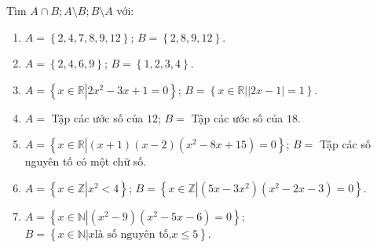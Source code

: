 \begin{bt}%
	 Tìm $A\cap B;A\setminus B;B\setminus A$ với:
	\begin{enumerate}
		\item $A=\left\{{2,4,7,8,9,12}\right\}$;  $B=\left\{{2,8,9,12}\right\}$.
		\item $A=\left\{{2,4,6,9}\right\}$;  $B=\left\{{1,2,3,4}\right\}$.
		\item $A=\left\{{x\in  \mathbb{R}\left|{2x^2-3x+1=0}\right.}\right\}$; $B=\left\{{x\in \mathbb{R}\left|{\left|{2x-1}\right|=1}\right.}\right\}$.
		\item $A=$ Tập các ước số của $12$; $B=$ Tập các ước số của  $18$.
		\item $A=\left\{{x\in \mathbb{R}\left|{(x+1)\left(x-2\right)\left(x^2-8x+15\right)=0}\right.}\right\}$; $B=$ Tập  các số nguyên tố có một chữ số.
		\item $A=\left\{{x\in \mathbb{Z}\left|{x^2<4}\right.}\right\}$; $B=\left\{{x\in \mathbb{Z}\left|{\left(5x-3x^2\right)\left(x^2-2x-3\right)=0}\right.}\right\}$. 
		\item  $A=\left\{{x\in \mathbb{N}\left|{\left(x^2-9\right)\left(x^2-5x-6\right)=0}\right.}\right\}$; $B=\left\{x\in \mathbb{N}|x\text{là số nguyên tố,}x\le 5\right\}$.
	\end{enumerate}
\end{bt}

